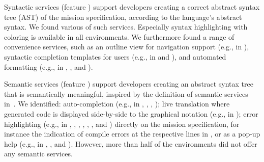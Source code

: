 
Syntactic services (feature \fsyntacticservices) support developers creating a correct abstract syntax tree (AST) of the mission specification, according to the language's abstract syntax. We found various of such services. Especially syntax highlighting with coloring is available in all environments.  %
We furthermore found a range of convenience services, such as an outline view for navigation support (e.g., in \picaxe), syntactic completion templates for users (e.g., in \edison and \ardublockly), and automated formatting (e.g., in \arcbotics, \robotmesh, and \vex).




Semantic services (feature \fsemanticservices) support developers creating an abstract syntax tree that is semantically meaningful, inspired by the definition of semantic services in~\citet{erdweg2013languageworkbenches}. We identified: auto-completion (e.g., in \vex, \trik, \picaxe, \edison);  live translation where generated code is displayed side-by-side to the graphical notation (e.g., in \easyc); error highlighting (e.g., in \edison, \aseba, \vex, \robotmesh, \blocklyprop, \minibloq, and \easyc) directly on the mission specification, for instance the indication of compile errors at the respective lines in \blocklyprop, or as a pop-up help (e.g., in \edison, \missionlab, and \choregraphe). However, more than half of the environments did not offer any semantic services. %


